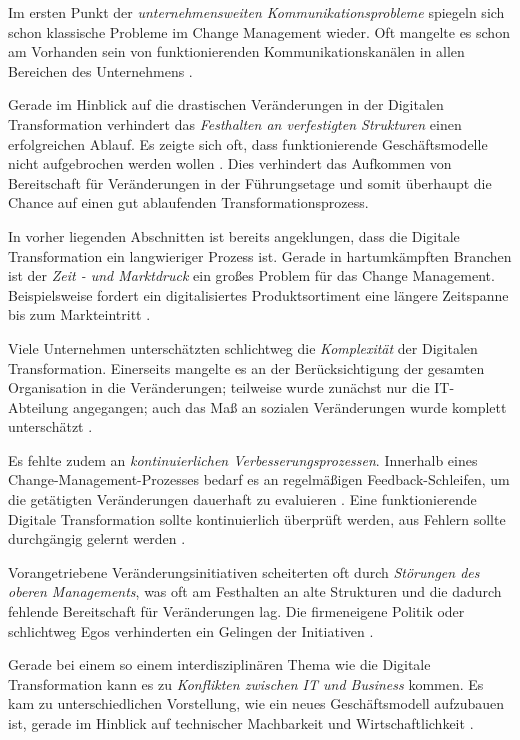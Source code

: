 Im ersten Punkt der \textit{unternehmensweiten Kommunikationsprobleme} spiegeln sich schon klassische Probleme im Change Management wieder. Oft mangelte es schon am Vorhanden sein von funktionierenden Kommunikationskanälen in allen Bereichen des Unternehmens \cite[S. 234]{muchna_aspekte_2018}. 

Gerade im Hinblick auf die drastischen Veränderungen in der Digitalen Transformation verhindert das \textit{Festhalten an verfestigten Strukturen} einen erfolgreichen Ablauf. Es zeigte sich oft, dass funktionierende Geschäftsmodelle nicht aufgebrochen werden wollen \cite[S. 194]{gassmann_digitale_2016}. Dies verhindert das Aufkommen von Bereitschaft für Veränderungen in der Führungsetage und somit überhaupt die Chance auf einen gut ablaufenden Transformationsprozess.

In vorher liegenden Abschnitten ist bereits angeklungen, dass die Digitale Transformation ein langwieriger Prozess ist. Gerade in hartumkämpften Branchen ist der \textit{Zeit - und Marktdruck} ein großes Problem für das Change Management. Beispielsweise fordert ein digitalisiertes Produktsortiment eine längere Zeitspanne bis zum Markteintritt \cite[S. 183]{urbach_digitalization_2018}.

Viele Unternehmen unterschätzten schlichtweg die \textit{Komplexität} der Digitalen Transformation. Einerseits mangelte  es an der Berücksichtigung der gesamten Organisation in die Veränderungen; teilweise wurde zunächst nur die IT-Abteilung angegangen; auch das Maß an sozialen Veränderungen wurde komplett unterschätzt \cite[S. 4]{hoberg_skills_2017}.

Es fehlte zudem an \textit{kontinuierlichen Verbesserungsprozessen}. Innerhalb eines Change-Management-Prozesses bedarf es an regelmäßigen Feedback-Schleifen, um die getätigten Veränderungen dauerhaft zu evaluieren \cite[S. 13]{kaune_change_2016}. Eine funktionierende Digitale Transformation sollte kontinuierlich überprüft werden, aus Fehlern sollte  durchgängig gelernt werden \cite[S. 15]{chanias_digital_2018}.

Vorangetriebene Veränderungsinitiativen scheiterten oft durch \textit{Störungen des oberen Managements}, was oft am Festhalten an alte Strukturen und die dadurch fehlende Bereitschaft für Veränderungen lag. Die firmeneigene Politik oder schlichtweg Egos verhinderten ein Gelingen der Initiativen \cite[S. 4]{solis_2017_2017}.

Gerade bei einem so einem interdisziplinären Thema wie die Digitale Transformation kann es zu \textit{Konflikten zwischen IT und Business} kommen. Es kam zu unterschiedlichen Vorstellung, wie ein neues Geschäftsmodell aufzubauen ist, gerade  im Hinblick auf technischer Machbarkeit und Wirtschaftlichkeit \cite[S. 117]{oswald_digitale_2018}.


